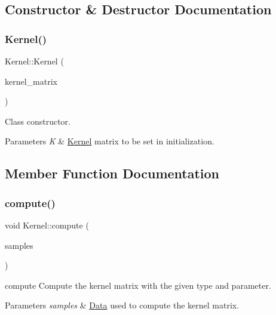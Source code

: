 \subsection{Constructor \& Destructor Documentation}
\mbox{\label{class_kernel_adf23c1567adb8ddb5757931587320871}} 
\subsubsection{\texorpdfstring{Kernel()}{Kernel()}}
{\footnotesize\ttfamily Kernel\+::\+Kernel (\begin{DoxyParamCaption}\item[{d\+Matrix}]{kernel\+\_\+matrix }\end{DoxyParamCaption})}



Class constructor. 


\begin{DoxyParams}{Parameters}
{\em K} & \hyperlink{class_kernel}{Kernel} matrix to be set in initialization. \\
\hline
\end{DoxyParams}


\subsection{Member Function Documentation}
\mbox{\label{class_kernel_a5dfd3a6b535745eadd9e17dc086d87c6}} 
\subsubsection{\texorpdfstring{compute()}{compute()}}
{\footnotesize\ttfamily void Kernel\+::compute (\begin{DoxyParamCaption}\item[{\hyperlink{class_data}{Data}}]{samples }\end{DoxyParamCaption})}



compute Compute the kernel matrix with the given type and parameter. 


\begin{DoxyParams}{Parameters}
{\em samples} & \hyperlink{class_data}{Data} used to compute the kernel matrix. \\
\hline
\end{DoxyParams}
\mbox{\label{class_kernel_aa07703cd76124769325d942582b16b5f}} 
